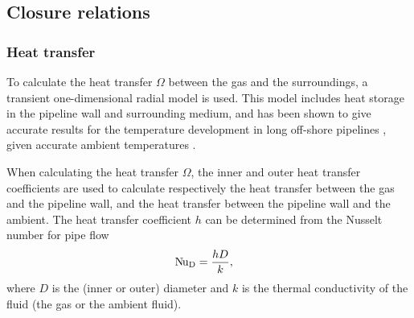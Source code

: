 \subsection{Closure relations}
\subsubsection{Heat transfer}
To calculate the heat transfer $\Omega$ between the gas and the surroundings, a transient one-dimensional radial model \cite{Chaczykowski2010Transient} is used. This model includes heat storage in the pipeline wall and surrounding medium, and has been shown to give accurate results for the temperature development in long off-shore pipelines \cite{Helgaker2014Validation,Oosterkamp2015Modelling,Oosterkamp2016Heat}, given accurate ambient temperatures \cite{Sund2015Pipeline}.

When calculating the heat transfer $\Omega$, the inner and outer heat transfer coefficients are used to calculate respectively the heat transfer between the gas and the pipeline wall, and the heat transfer between the pipeline wall and the ambient. The heat transfer coefficient $h$ can be determined from the Nusselt number for pipe flow
\begin{align}
    &\operatorname{N\kern-.09em u}_\mathrm{D} = \frac{hD}{k}
,
\end{align}
where $D$ is the (inner or outer) diameter and $k$ is the thermal conductivity of the fluid (the gas or the ambient fluid).


